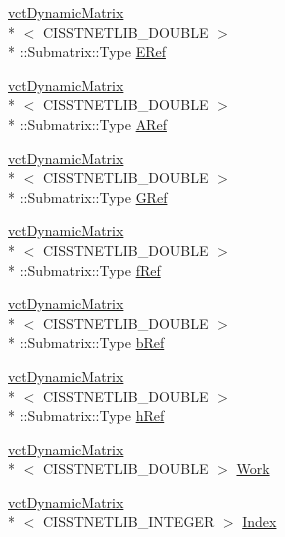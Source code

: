 \begin{DoxyCompactItemize}
\hyperlink{classvct_dynamic_matrix}{vct\-Dynamic\-Matrix}\\*
$<$ C\-I\-S\-S\-T\-N\-E\-T\-L\-I\-B\-\_\-\-D\-O\-U\-B\-L\-E $>$\\*
\-::Submatrix\-::\-Type \hyperlink{classnmr_l_s_e_i_solver_a13a0319be7a8773f42b2d6b26b33001e}{E\-Ref}
\item 
\hyperlink{classvct_dynamic_matrix}{vct\-Dynamic\-Matrix}\\*
$<$ C\-I\-S\-S\-T\-N\-E\-T\-L\-I\-B\-\_\-\-D\-O\-U\-B\-L\-E $>$\\*
\-::Submatrix\-::\-Type \hyperlink{classnmr_l_s_e_i_solver_aec36ff37069c0f838c9cf92b8ab607b9}{A\-Ref}
\item 
\hyperlink{classvct_dynamic_matrix}{vct\-Dynamic\-Matrix}\\*
$<$ C\-I\-S\-S\-T\-N\-E\-T\-L\-I\-B\-\_\-\-D\-O\-U\-B\-L\-E $>$\\*
\-::Submatrix\-::\-Type \hyperlink{classnmr_l_s_e_i_solver_ac4742f5e6f42cd0cc63f00b70a26a84f}{G\-Ref}
\item 
\hyperlink{classvct_dynamic_matrix}{vct\-Dynamic\-Matrix}\\*
$<$ C\-I\-S\-S\-T\-N\-E\-T\-L\-I\-B\-\_\-\-D\-O\-U\-B\-L\-E $>$\\*
\-::Submatrix\-::\-Type \hyperlink{classnmr_l_s_e_i_solver_abecdcb81cac955ea6a1f36eb305fb13f}{f\-Ref}
\item 
\hyperlink{classvct_dynamic_matrix}{vct\-Dynamic\-Matrix}\\*
$<$ C\-I\-S\-S\-T\-N\-E\-T\-L\-I\-B\-\_\-\-D\-O\-U\-B\-L\-E $>$\\*
\-::Submatrix\-::\-Type \hyperlink{classnmr_l_s_e_i_solver_a379afee982530ff5d7d0c60b6b1a71d6}{b\-Ref}
\item 
\hyperlink{classvct_dynamic_matrix}{vct\-Dynamic\-Matrix}\\*
$<$ C\-I\-S\-S\-T\-N\-E\-T\-L\-I\-B\-\_\-\-D\-O\-U\-B\-L\-E $>$\\*
\-::Submatrix\-::\-Type \hyperlink{classnmr_l_s_e_i_solver_a36515975cc4d9e31a1f44a9c008e5c3a}{h\-Ref}
\item 
\hyperlink{classvct_dynamic_matrix}{vct\-Dynamic\-Matrix}\\*
$<$ C\-I\-S\-S\-T\-N\-E\-T\-L\-I\-B\-\_\-\-D\-O\-U\-B\-L\-E $>$ \hyperlink{classnmr_l_s_e_i_solver_a94fbd24b049a1561921e78657ed07646}{Work}
\item 
\hyperlink{classvct_dynamic_matrix}{vct\-Dynamic\-Matrix}\\*
$<$ C\-I\-S\-S\-T\-N\-E\-T\-L\-I\-B\-\_\-\-I\-N\-T\-E\-G\-E\-R $>$ \hyperlink{classnmr_l_s_e_i_solver_a1cc899c7154c60c279bfa6ffe2f836a3}{Index}
\end{DoxyCompactItemize}


